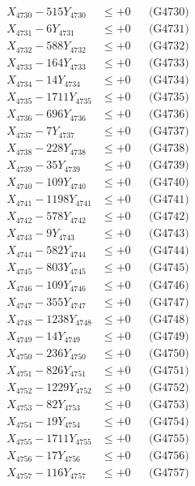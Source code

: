 \documentclass[a4paper,10pt]{article}
\begin{document}
{\begin{align}
X_{4730} - 515Y_{4730} &\leq +0 && \text{(G4730)} \\
\allowbreak
X_{4731} - 6Y_{4731} &\leq +0 && \text{(G4731)} \\
X_{4732} - 588Y_{4732} &\leq +0 && \text{(G4732)} \\
X_{4733} - 164Y_{4733} &\leq +0 && \text{(G4733)} \\
X_{4734} - 14Y_{4734} &\leq +0 && \text{(G4734)} \\
X_{4735} - 1711Y_{4735} &\leq +0 && \text{(G4735)} \\
X_{4736} - 696Y_{4736} &\leq +0 && \text{(G4736)} \\
X_{4737} - 7Y_{4737} &\leq +0 && \text{(G4737)} \\
X_{4738} - 228Y_{4738} &\leq +0 && \text{(G4738)} \\
X_{4739} - 35Y_{4739} &\leq +0 && \text{(G4739)} \\
X_{4740} - 109Y_{4740} &\leq +0 && \text{(G4740)} \\
\allowbreak
X_{4741} - 1198Y_{4741} &\leq +0 && \text{(G4741)} \\
X_{4742} - 578Y_{4742} &\leq +0 && \text{(G4742)} \\
X_{4743} - 9Y_{4743} &\leq +0 && \text{(G4743)} \\
X_{4744} - 582Y_{4744} &\leq +0 && \text{(G4744)} \\
X_{4745} - 803Y_{4745} &\leq +0 && \text{(G4745)} \\
X_{4746} - 109Y_{4746} &\leq +0 && \text{(G4746)} \\
X_{4747} - 355Y_{4747} &\leq +0 && \text{(G4747)} \\
X_{4748} - 1238Y_{4748} &\leq +0 && \text{(G4748)} \\
X_{4749} - 14Y_{4749} &\leq +0 && \text{(G4749)} \\
X_{4750} - 236Y_{4750} &\leq +0 && \text{(G4750)} \\
\allowbreak
X_{4751} - 826Y_{4751} &\leq +0 && \text{(G4751)} \\
X_{4752} - 1229Y_{4752} &\leq +0 && \text{(G4752)} \\
X_{4753} - 82Y_{4753} &\leq +0 && \text{(G4753)} \\
X_{4754} - 19Y_{4754} &\leq +0 && \text{(G4754)} \\
X_{4755} - 1711Y_{4755} &\leq +0 && \text{(G4755)} \\
X_{4756} - 17Y_{4756} &\leq +0 && \text{(G4756)} \\
X_{4757} - 116Y_{4757} &\leq +0 && \text{(G4757)} \\

\end{align}}
\end{document}
